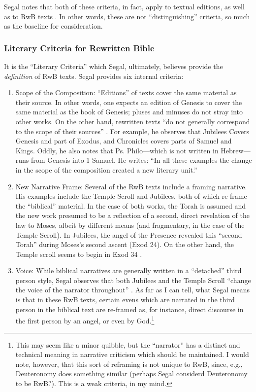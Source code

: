Segal notes that both of these criteria, in fact, apply to textual
editions, as well as to RwB texts \autocite[20]{segal_henze2005}. In
other words, these are not ``distinguishing'' criteria, so much as the
baseline for consideration.

\subsubsection{Literary Criteria for
Rewritten Bible}\label{literary-criteria-for-rwb}

It is the ``Literary Criteria'' which Segal, ultimately, believes
provide the \emph{definition} of RwB
texts.\autocite[20]{segal_henze2005} Segal provides six internal
criteria:

\begin{enumerate}
\def\labelenumi{\arabic{enumi}.}
\item
  Scope of the Composition: ``Editions'' of texts cover the same
  material as their source. In other words, one expects an edition of
  Genesis to cover the same material as the book of Genesis; pluses and
  minuses do not stray into other works. On the other hand, rewritten
  texts ``do not generally correspond to the scope of their sources''
  \autocite[20]{segal_henze2005}. For example, he observes that Jubilees
  Covers Genesis and part of Exodus, and Chronicles covers parts of
  Samuel and Kings. Oddly, he also notes that Ps. Philo---which is not
  written in Hebrew---runs from Genesis into 1 Samuel. He writes: ``In
  all these examples the change in the scope of the composition created
  a new literary unit.'' \autocite[20--21]{segal_henze2005}
\item
  New Narrative Frame: Several of the RwB texts include a framing
  narrative. His examples include the Temple Scroll and Jubilees, both
  of which re-frame the ``biblical'' material. In the case of both
  works, the Torah is assumed and the new work presumed to be a
  reflection of a second, direct revelation of the law to Moses, albeit
  by different means (and fragmentary, in the case of the
  Temple Scroll). In Jubilees, the angel of the Presence revealed this
  ``second Torah'' during Moses's second ascent (Exod 24). On the other
  hand, the Temple scroll seems to begin in Exod 34
  \autocite[22]{segal_henze2005}.
\item
  Voice: While biblical narratives are generally written in a
  ``detached'' third person style, Segal observes that both Jubilees and
  the Temple Scroll ``change the voice of the narrator throughout''
  \autocite[22]{segal_henze2005}. As far as I can tell, what Segal means
  is that in these RwB texts, certain evens which are narrated in the
  third person in the biblical text are re-framed as, for instance,
  direct discourse in the first person by an angel, or even by
  God.\footnote{This may seem like a minor quibble, but the ``narrator''
    has a distinct and technical meaning in narrative criticism which
    should be maintained. I would note, however, that this sort of
    reframing is not unique to RwB, since, e.g., Deuteronomy does
    something similar (perhaps Segal considerd Deuteronomy to be RwB?).
    This is a weak criteria, in my mind.}
\end{enumerate}

